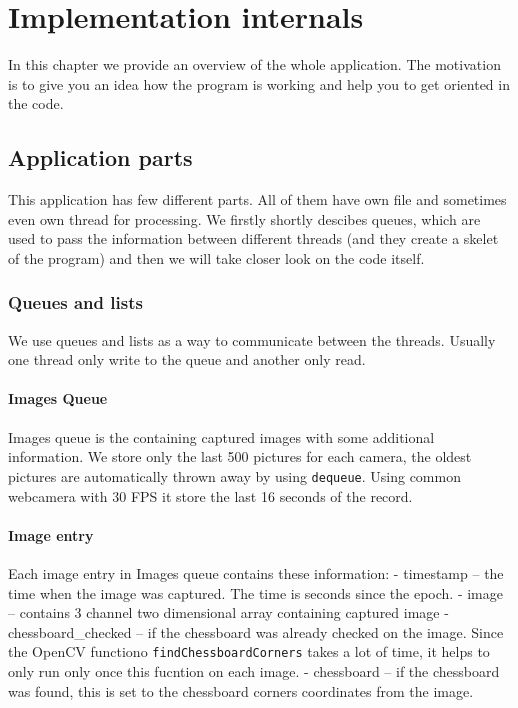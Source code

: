 \chapter{Implementation internals}

In this chapter we provide an overview of the whole application. The motivation
is to give you an idea how the program is working and help you to get oriented
in the code.

\section{Application parts}
This application has few different parts. All of them have own file and
sometimes even own thread for processing. We firstly shortly descibes queues,
which are used to pass the information between different threads (and they
create a skelet of the program) and then we will take closer look on the code
itself.

\subsection{Queues and lists}

We use queues and lists as a way to communicate between the threads. Usually
one thread only write to the queue and another only read.

\subsubsection{Images Queue}

Images queue is the containing captured images with some additional
information. We store only the last 500 pictures for each camera, the oldest
pictures are automatically thrown away by using \verb+dequeue+. Using common
webcamera with 30 FPS it store the last 16 seconds of the record.

\subsubsection*{Image entry}

Each image entry in Images queue contains these information:
- timestamp -- the time when the image was captured. The time is seconds since the epoch.
- image -- contains 3 channel two dimensional array containing captured image
- chessboard{\_}checked -- if the chessboard was already checked on the image.
  Since the OpenCV functiono \verb+findChessboardCorners+ takes a lot of time,
  it helps to only run only once this fucntion on each image.
- chessboard -- if the chessboard was found, this is set to the chessboard
  corners coordinates from the image.

